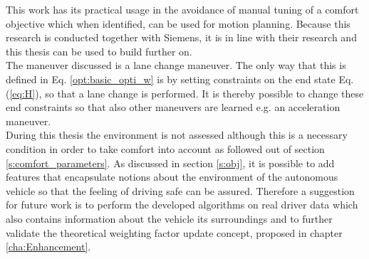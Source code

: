 This work has its practical usage in the avoidance of manual tuning of a comfort objective which when identified, can be used for motion planning. Because this research is conducted together with Siemens, it is in line with their research and this thesis can be used to build further on.\\
The maneuver discussed is a lane change maneuver. The only way that this is defined in Eq. \ref{opt:basic_opti_w} is by setting constraints on the end state Eq. (\ref{eq:H}), so that a lane change is performed. It is thereby possible to change these end constraints so that also other maneuvers are learned e.g. an acceleration maneuver.\\
During this thesis the environment is not assessed although this is a necessary condition in order to take comfort into account as followed out of section \ref{s:comfort_parameters}. As discussed in section \ref{s:obj}, it is possible to add features that encapsulate notions about the environment of the autonomous vehicle so that the feeling of driving safe can be assured. Therefore a suggestion for future work is to perform the developed algorithms on real driver data which also contains information about the vehicle its surroundings and to further validate the theoretical weighting factor update concept, proposed in chapter \ref{cha:Enhancement}.

%



